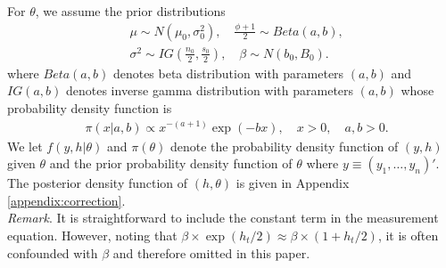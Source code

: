 For $\theta$, we assume the prior distributions
\begin{align*}
    &\mu \sim N(\mu_0, \sigma_0^2), \quad
    \frac{\phi+1}{2} \sim Beta(a,b), \\
    &\sigma^2 \sim IG \left( \frac{n_0}{2}, \frac{s_0}{2} \right),  \quad
    \beta \sim N(b_0, B_0).
\end{align*}
where $Beta(a,b)$ denotes beta distribution with parameters $(a,b)$ and $IG(a,b)$ denotes inverse gamma distribution with parameters $(a,b)$ whose probability density function is
\begin{align*}
& \pi(x|a,b) \propto x^{-(a+1)}\exp(-bx),\quad x >0, \quad a,b>0. 
\end{align*}
We let $f(y, h|\theta)$ and $\pi(\theta)$ denote the probability density function of $(y, h)$ given $\theta$ and the prior probability density function of $\theta$ where $y \equiv (y_1, \dots, y_n)'$. The posterior density function of $(h, \theta)$ is given in Appendix \ref{appendix:correction}.
\vspace{1mm}\\

\noindent
{\it Remark}. It is straightforward to include the constant term in the measurement equation. However, noting that $\beta \times \exp(h_t/2) \approx  \beta \times (1 + h_t/2)$, it is often confounded with $\beta$ and therefore omitted in this paper. 
